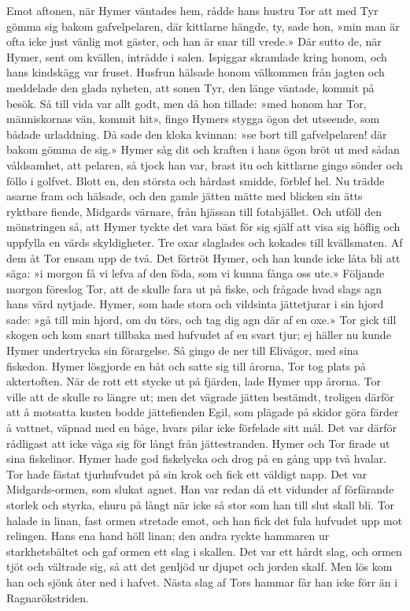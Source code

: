 Emot aftonen, när Hymer väntades hem, rådde hans hustru Tor att med Tyr
gömma sig bakom gafvelpelaren, där kittlarne hängde, ty, sade hon, »min
man är ofta icke just vänlig mot gäster, och han är snar till vrede.»
Där sutto de, när Hymer, sent om kvällen, inträdde i salen. Ispiggar
skramlade kring honom, och hans kindskägg var fruset. Husfrun hälsade
honom välkommen från jagten och meddelade den glada nyheten, att sonen
Tyr, den länge väntade,
kommit på besök. Så till vida var allt godt, men då hon tillade: »med
honom har Tor, människornas vän, kommit hit», fingo Hymers stygga ögon
det utseende, som bådade urladdning. Då sade den kloka kvinnan: »se bort
till gafvelpelaren! där bakom gömma de sig.» Hymer såg dit och kraften i
hans ögon bröt ut med sådan våldsamhet, att pelaren, så tjock han var,
brast itu och kittlarne gingo sönder och föllo i golfvet. Blott en, den
största och hårdast smidde, förblef hel. Nu trädde asarne fram och
hälsade, och den gamle jätten mätte med blicken sin ätts ryktbare
fiende, Midgards värnare, från hjässan till fotabjället. Och utföll den
mönstringen så, att Hymer tyckte det vara bäst för sig själf att visa
sig höflig och uppfylla en värds skyldigheter. Tre oxar slaglades och
kokades till kvällsmaten. Af dem åt Tor ensam upp de två. Det förtröt
Hymer, och han kunde icke låta bli att säga: »i morgon få vi lefva af
den föda, som vi kunna fånga oss ute.» Följande morgon föreslog Tor, att
de skulle fara ut på fiske, och frågade hvad slags agn hans värd
nytjade. Hymer, som hade stora och vildsinta jättetjurar i sin hjord
sade: »gå till min hjord, om du törs, och tag dig agn där af en oxe.»
Tor gick till skogen och kom snart tillbaka med hufvudet af en svart
tjur; ej häller nu kunde Hymer undertrycka sin förargelse. Så gingo de
ner till Elivågor, med sina fiskedon. Hymer lösgjorde en båt och satte
sig till årorna, Tor tog plats på aktertoften. När de rott ett stycke ut
på fjärden, lade Hymer upp årorna. Tor ville att de skulle ro längre ut;
men det vägrade jätten bestämdt, troligen därför att å motsatta kusten
bodde jättefienden Egil, som plägade på skidor göra färder å vattnet,
väpnad med en båge, hvars pilar icke förfelade sitt mål. Det var därför
rådligast att icke våga sig för långt från jättestranden. Hymer och Tor
firade ut sina fiskelinor. Hymer hade god fiskelycka och drog på en gång
upp två hvalar. Tor hade fästat tjurhufvudet på sin krok och fick ett
väldigt napp. Det var Midgards-ormen, som slukat agnet. Han var redan då
ett vidunder af förfärande storlek och styrka, ehuru
på långt när icke så stor som han till slut skall bli. Tor halade in
linan, fast ormen stretade emot, och han fick det fula hufvudet upp mot
relingen. Hans ena hand höll linan; den andra ryckte hammaren ur
starkhetsbältet och gaf ormen ett slag i skallen. Det var ett hårdt
slag, och ormen tjöt och vältrade sig, så att det genljöd ur djupet och
jorden skalf. Men lös kom han och sjönk åter ned i hafvet. Nästa slag af
Tors hammar får han icke förr än i Ragnarökstriden.

